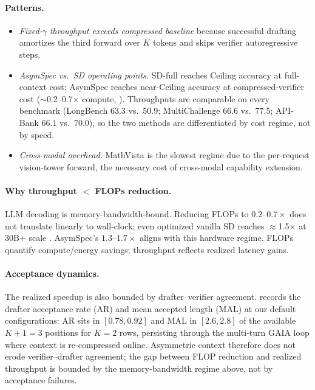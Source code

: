 \documentclass[11pt]{article}
\theoremstyle{plain}
\theoremstyle{definition}
\begin{document}
\paragraph{Patterns.}
\begin{itemize}\itemsep0pt
\item \emph{Fixed-$\gamma$ throughput exceeds compressed baseline} because successful drafting amortizes the third forward over $K$ tokens and skips verifier autoregressive steps.
\item \emph{AsymSpec vs.\ SD operating points.} SD-full reaches Ceiling accuracy at full-context cost; AsymSpec reaches near-Ceiling accuracy at compressed-verifier cost ($\sim$0.2--0.7$\times$ compute, ). Throughputs are comparable on every benchmark (LongBench $63.3$ vs.\ $50.9$; MultiChallenge $66.6$ vs.\ $77.5$; API-Bank $66.1$ vs.\ $70.0$), so the two methods are differentiated by cost regime, not by speed.
\item \emph{Cross-modal overhead.} MathVista is the slowest regime due to the per-request vision-tower forward, the necessary cost of cross-modal capability extension.
\end{itemize}

\paragraph{Why throughput $<$ FLOPs reduction.}
LLM decoding is memory-bandwidth-bound. Reducing FLOPs to $0.2$--$0.7\times$ does not translate linearly to wall-clock; even optimized vanilla SD reaches $\approx$1.5$\times$ at 30B+ scale \citep{xia2024specbench}. AsymSpec's $1.3$--$1.7\times$ aligns with this hardware regime. FLOPs quantify compute/energy savings; throughput reflects realized latency gains.

\paragraph{Acceptance dynamics.}
The realized speedup is also bounded by drafter--verifier agreement.  records the drafter acceptance rate (AR) and mean accepted length (MAL) at our default configurations: AR sits in $[0.78, 0.92]$ and MAL in $[2.6, 2.8]$ of the available $K+1{=}3$ positions for $K{=}2$ rows, persisting through the multi-turn GAIA loop where context is re-compressed online. Asymmetric context therefore does not erode verifier--drafter agreement; the gap between FLOP reduction and realized throughput is bounded by the memory-bandwidth regime above, not by acceptance failures.
\end{document}

